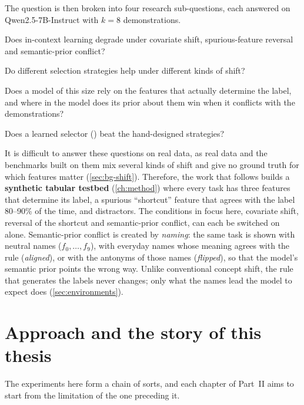 The question is then broken into four research sub-questions, each answered on Qwen2.5-7B-Instruct \citep{qwen2024qwen25} with $k = 8$ demonstrations.

\begin{description}[leftmargin=2.4em, style=nextline]
  \item[\RQ1] Does in-context learning degrade under covariate shift, spurious-feature reversal and semantic-prior conflict?
  \item[\RQ2] Do different selection strategies help under different kinds of shift?
  \item[\RQ3] Does a model of this size rely on the features that actually determine the label, and where in the model does its prior about them win when it conflicts with the demonstrations?
  \item[\RQ4] Does a learned selector (\sata) beat the hand-designed strategies?
\end{description}


It is difficult to answer these questions on real data, as real data and the benchmarks built on them mix several kinds of shift and give no ground truth for which features matter (\autoref{sec:bg-shift}). Therefore, the work that follows builds a \textbf{synthetic tabular testbed} (\autoref{ch:method}) where every task has three features that determine its label, a spurious ``shortcut'' feature that agrees with the label 80--90\% of the time, and distractors. The conditions in focus here, covariate shift, reversal of the shortcut and semantic-prior conflict, can each be switched on alone. Semantic-prior conflict is created by \emph{naming}: the same task is shown with neutral names ($f_0, \ldots, f_9$), with everyday names whose meaning agrees with the rule (\emph{aligned}), or with the antonyms of those names (\emph{flipped}), so that the model's semantic prior points the wrong way. Unlike conventional concept shift, the rule that generates the labels never changes; only what the names lead the model to expect does (\autoref{sec:environments}).

\newpage
\section{Approach and the story of this thesis}

The experiments here form a chain of sorts, and each chapter of Part~II aims to start from the limitation of the one preceding it.

